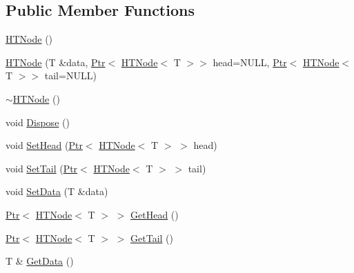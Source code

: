 \subsection*{Public Member Functions}
\begin{DoxyCompactItemize}
\item 
\mbox{\hyperlink{classpdl_1_1collection_1_1_h_t_node_a2265e71e885e3589270255409c6e6ddc}{H\+T\+Node}} ()
\item 
\mbox{\hyperlink{classpdl_1_1collection_1_1_h_t_node_a72036c32a7e927920ff35fd38893d75f}{H\+T\+Node}} (T \&data, \mbox{\hyperlink{classpdl_1_1memory_1_1_ptr}{Ptr}}$<$ \mbox{\hyperlink{classpdl_1_1collection_1_1_h_t_node}{H\+T\+Node}}$<$ T $>$$>$ head=N\+U\+LL, \mbox{\hyperlink{classpdl_1_1memory_1_1_ptr}{Ptr}}$<$ \mbox{\hyperlink{classpdl_1_1collection_1_1_h_t_node}{H\+T\+Node}}$<$ T $>$$>$ tail=N\+U\+LL)
\item 
\mbox{\hyperlink{classpdl_1_1collection_1_1_h_t_node_a75eaf253205f910d507e46710278c69d}{$\sim$\+H\+T\+Node}} ()
\item 
void \mbox{\hyperlink{classpdl_1_1collection_1_1_h_t_node_a4e8455aaf28ad7b54073c517d07380e0}{Dispose}} ()
\item 
void \mbox{\hyperlink{classpdl_1_1collection_1_1_h_t_node_afdbecfe1fef19d969265f1956b625895}{Set\+Head}} (\mbox{\hyperlink{classpdl_1_1memory_1_1_ptr}{Ptr}}$<$ \mbox{\hyperlink{classpdl_1_1collection_1_1_h_t_node}{H\+T\+Node}}$<$ T $>$ $>$ head)
\item 
void \mbox{\hyperlink{classpdl_1_1collection_1_1_h_t_node_aa44a852a9da1c02cab7694e62304c31d}{Set\+Tail}} (\mbox{\hyperlink{classpdl_1_1memory_1_1_ptr}{Ptr}}$<$ \mbox{\hyperlink{classpdl_1_1collection_1_1_h_t_node}{H\+T\+Node}}$<$ T $>$ $>$ tail)
\item 
void \mbox{\hyperlink{classpdl_1_1collection_1_1_h_t_node_ac97718539573acc854eee6303da08326}{Set\+Data}} (T \&data)
\item 
\mbox{\hyperlink{classpdl_1_1memory_1_1_ptr}{Ptr}}$<$ \mbox{\hyperlink{classpdl_1_1collection_1_1_h_t_node}{H\+T\+Node}}$<$ T $>$ $>$ \mbox{\hyperlink{classpdl_1_1collection_1_1_h_t_node_a816f962bafc751a3622c7e7f67a6403b}{Get\+Head}} ()
\item 
\mbox{\hyperlink{classpdl_1_1memory_1_1_ptr}{Ptr}}$<$ \mbox{\hyperlink{classpdl_1_1collection_1_1_h_t_node}{H\+T\+Node}}$<$ T $>$ $>$ \mbox{\hyperlink{classpdl_1_1collection_1_1_h_t_node_a1e74bb582d2fa4d0ea66bbbd0cc617fd}{Get\+Tail}} ()
\item 
T \& \mbox{\hyperlink{classpdl_1_1collection_1_1_h_t_node_a88e46b903cebdd06eb6f034e0d028a44}{Get\+Data}} ()
\end{DoxyCompactItemize}
